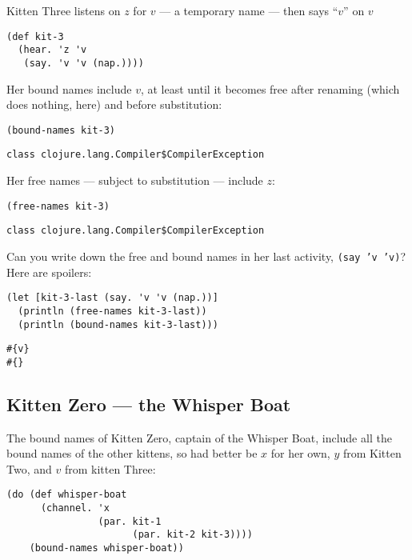 \documentclass[10pt,oneside,x11names]{article}
\theoremstyle{definition}
\theoremstyle{warning}
\begin{document}
Kitten Three listens on \(z\) for \(v\) --- a temporary name --- then
says ``\(v\)'' on \(v\)

\vskip 0.26cm
\begin{verbatim}
(def kit-3
  (hear. 'z 'v
   (say. 'v 'v (nap.))))
\end{verbatim}

Her bound names include \(v\), at least until it becomes free after
renaming (which does nothing, here) and before substitution:

\vskip 0.26cm
\begin{verbatim}
(bound-names kit-3)
\end{verbatim}

\begin{verbatim}
class clojure.lang.Compiler$CompilerException
\end{verbatim}


Her free names --- subject to substitution --- include \(z\):

\vskip 0.26cm
\begin{verbatim}
(free-names kit-3)
\end{verbatim}

\begin{verbatim}
class clojure.lang.Compiler$CompilerException
\end{verbatim}


Can you write down the free and bound names in her last activity,
\texttt{(say 'v 'v)}? Here are spoilers:

\vskip 0.26cm
\begin{verbatim}
(let [kit-3-last (say. 'v 'v (nap.))]
  (println (free-names kit-3-last))
  (println (bound-names kit-3-last)))
\end{verbatim}

\begin{verbatim}
#{v}
#{}
\end{verbatim}

\subsection{Kitten Zero --- the Whisper Boat}
\label{sec:orgf982478}

The bound names of Kitten Zero, captain of the Whisper Boat,
include all the bound names of the other kittens, so had better be
\(x\) for her own, \(y\) from Kitten Two, and \(v\) from kitten Three:

\vskip 0.26cm
\begin{verbatim}
(do (def whisper-boat
      (channel. 'x
                (par. kit-1
                      (par. kit-2 kit-3))))
    (bound-names whisper-boat))
\end{verbatim}
\end{document}
